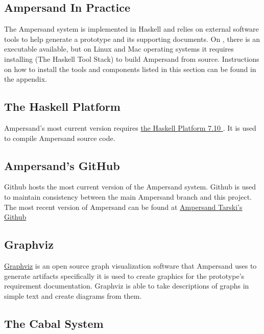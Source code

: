 \documentclass[journal,12pt,onecolumn,draftclsnofoot]{report}
\let\Oldsubsection\subsection
\renewcommand{\subsection}{\FloatBarrier\Oldsubsection}
\begin{document}
\subsection{Ampersand In Practice}

The Ampersand system is implemented in Haskell and relies on external software 
tools to help generate a prototype and its supporting documents.
On , 
there is an executable available, but on Linux and Mac operating systems it 
requires installing  (The Haskell Tool Stack)
to build Ampersand from source. 
Instructions on how to install the tools and components listed in this section 
can be found in the appendix.

\subsection*{The Haskell Platform}
\noindent
Ampersand's most current version requires 
\href{https://www.haskell.org/platform/}{the Haskell Platform 7.10 }.
It is used to compile Ampersand source code.


\subsection*{Ampersand's GitHub}\label{Github}
\noindent
Github hosts the most current version of the Ampersand system. Github is used 
to maintain consistency between the main Ampersand branch and this project. The 
most recent version of Ampersand can be found at 
\href{https://github.com/AmpersandTarski}{Ampersand Tarski's Github }


\subsection*{Graphviz}
\noindent
\href{http://www.softpedia.com/get/Others/Miscellaneous/Graphviz.shtml}{Graphviz}
 is an open source graph visualization software that Ampersand uses to generate 
 artifacts specifically it is used to create graphics for the prototype's 
 requirement documentation. Graphviz is able to take descriptions of graphs in 
 simple text and create diagrams from them. 

\subsection*{The Cabal System}
\end{document}
